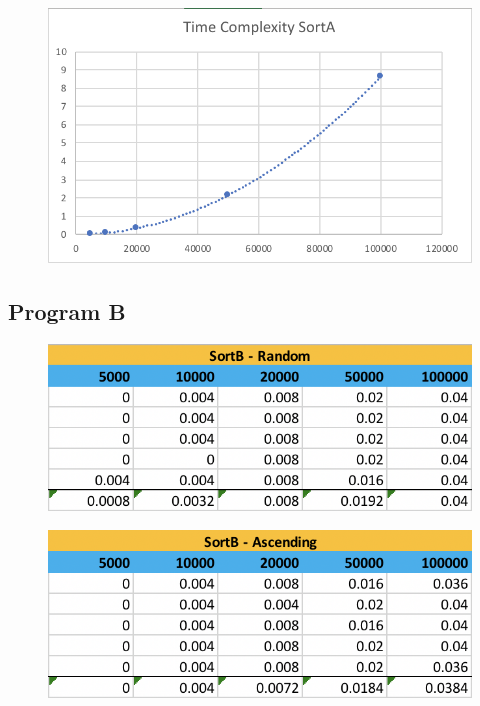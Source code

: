 \documentclass[a4paper]{article}
\begin{document}
\begin{appendices}
	\begin{figure}[h!]
	\begin{center}
	\includegraphics[width=\linewidth]{A_TC.png}
	\end{center}
	\end{figure}
	\pagebreak

\subsection{Program B}

	\begin{figure}[h!]
	\begin{center}
	\includegraphics[width=\linewidth]{B_R.png}
	\end{center}
	\end{figure}

	\begin{figure}[h!]
	\begin{center}
	\includegraphics[width=\linewidth]{B_S.png}
	\end{center}
	\end{figure}


\end{appendices}
\end{document}
